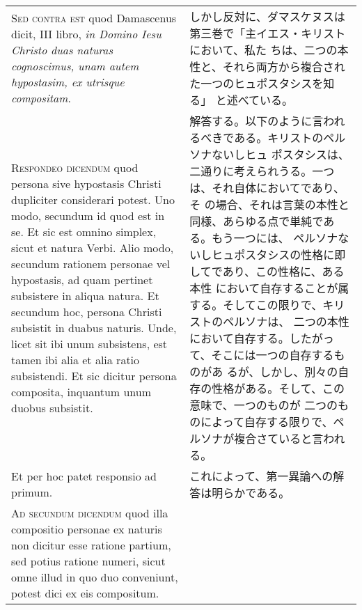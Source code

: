 \documentclass[10pt]{jsarticle} %
\begin{document}
\begin{longtable}{p{21em}p{21em}}
\\



{\scshape Sed contra est} quod Damascenus dicit, III libro, {\itshape
in Domino Iesu Christo duas naturas cognoscimus, unam autem
hypostasim, ex utrisque compositam}.


&

しかし反対に、ダマスケヌスは第三巻で「主イエス・キリストにおいて、私た
ちは、二つの本性と、それら両方から複合された一つのヒュポスタシスを知る」
と述べている。

\\



{\scshape Respondeo dicendum} quod persona sive hypostasis Christi
dupliciter considerari potest. Uno modo, secundum id quod est in
se. Et sic est omnino simplex, sicut et natura Verbi. Alio modo,
secundum rationem personae vel hypostasis, ad quam pertinet subsistere
in aliqua natura. Et secundum hoc, persona Christi subsistit in duabus
naturis. Unde, licet sit ibi unum subsistens, est tamen ibi alia et
alia ratio subsistendi. Et sic dicitur persona composita, inquantum
unum duobus subsistit.


&

解答する。以下のように言われるべきである。キリストのペルソナないしヒュ
ポスタシスは、二通りに考えられうる。一つは、それ自体においてであり、そ
の場合、それは言葉の本性と同様、あらゆる点で単純である。もう一つには、
ペルソナないしヒュポスタシスの性格に即してであり、この性格に、ある本性
において自存することが属する。そしてこの限りで、キリストのペルソナは、
二つの本性において自存する。したがって、そこには一つの自存するものがあ
るが、しかし、別々の自存の性格がある。そして、この意味で、一つのものが
二つのものによって自存する限りで、ペルソナが複合さていると言われる。

\\



Et per hoc patet responsio ad primum.


&

これによって、第一異論への解答は明らかである。

\\



{\scshape Ad secundum dicendum} quod illa compositio personae ex
naturis non dicitur esse ratione partium, sed potius ratione numeri,
sicut omne illud in quo duo conveniunt, potest dici ex eis compositum.



\end{longtable}
\end{document}
